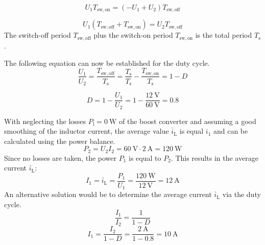 \begin{solutionblock}
    \begin{equation}
        U_{\mathrm{1}}T_{\mathrm{sw,on}}= (-U_{\mathrm{1}}+U_{\mathrm{2}})T_{\mathrm{sw,off}}
    \end{equation}

    \begin{equation}
        U_{\mathrm{1}}(T_{\mathrm{sw,off}}+T_{\mathrm{sw,on}})=  U_{\mathrm{2}}T_{\mathrm{sw,off}}
    \end{equation}
    The switch-off period $T_{\mathrm{sw,off}}$ plus the switch-on period $T_{\mathrm{sw,on}}$ is the total period $T_{\mathrm{s}}$.

    The following equation can now be established for the duty cycle.
    \begin{equation}
        \frac{U_{\mathrm{1}}}{U_{\mathrm{2}}}= \frac{T_{\mathrm{sw,off}}}{T_{\mathrm{s}}}= \frac{T_{\mathrm{s}}}{T_{\mathrm{s}}}-\frac{T_{\mathrm{sw,on}}}{T_{\mathrm{s}}} = 1-D
    \end{equation}

    \begin{equation}
        D = 1-\frac{U_{\mathrm{1}}}{U_{\mathrm{2}}} = 1- \frac {\SI{12}{\volt}} {\SI{60}{\volt}} = 0.8
    \end{equation}
\end{solutionblock}


\begin{solutionblock}
    With neglecting the losses $P_{\mathrm{l}} = \SI{0}{\watt}$ of the boost converter and assuming a good smoothing of the inductor current, the average value $\overline i_{\mathrm{L}}$ is equal $i_{\mathrm{1}}$ and can be calculated using the power balance.
    \begin{equation}
        P_{\mathrm{2}} = U_{\mathrm{2}} I_{\mathrm{2}} = {\SI{60}{\volt}} \cdot {\SI{2}{\ampere}} = {\SI{120}{\watt}}
    \end{equation}
    Since no losses are taken, the power  $P_{\mathrm{1}}$ is equal to  $P_{\mathrm{2}}$.
    This results in the average current $\overline i_{\mathrm{L}}$:
    \begin{equation}
         I_{\mathrm{1}} = \overline i_{\mathrm{L}} = \frac{P_{\mathrm{1}}}{U_{\mathrm{1}}}= \frac{\SI{120}{\watt}}{\SI{12}{\volt}} = \SI{12}{\ampere}
    \end{equation}
    An alternative solution would be to determine the average current $\overline i_{\mathrm{L}}$ via the duty cycle.
    \begin{equation}
    \frac{I_{\mathrm{1}}}{I_{\mathrm{2}}}=\frac{1}{1-D}
    \end{equation}
    \begin{equation}
     I_{\mathrm{1}}=\frac{I_{\mathrm{2}}}{1-D}=\frac{\SI{2}{\ampere}}{1-0.8}= \SI{10}{\ampere}
    \end{equation}
\end{solutionblock}

